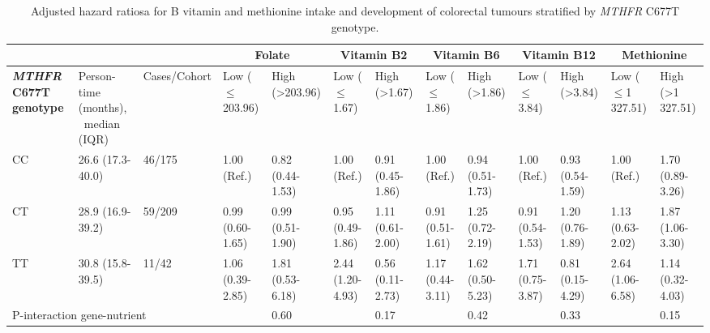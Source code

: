 \begin{sidewaystable}
\caption{Adjusted hazard ratiosa for B vitamin and methionine intake and development of colorectal tumours stratified by \emph{MTHFR} C677T genotype.}
\label{table6_3}
\begin{tabularx}{18cm}{XXXXXXXXXXXXX}
\hline ~ & ~ & ~ &
\multicolumn{2}{c}{\centering\bfseries Folate} &
\multicolumn{2}{c}{\centering\bfseries Vitamin B2} &
\multicolumn{2}{c}{\centering\bfseries Vitamin B6} &
\multicolumn{2}{c}{\centering\bfseries Vitamin B12} &
\multicolumn{2}{c}{\centering\bfseries Methionine}\\
\hline
 \textbf{\textit{MTHFR }}\textbf{C677T
genotype} & Person-time (months), \ median (IQR) & Cases/Cohort & Low (${\leq}$203.96) & High ({\textgreater}203.96) & Low (${\leq}$1.67) & High ({\textgreater}1.67) & Low (${\leq}$1.86) & High ({\textgreater}1.86) & Low (${\leq}$3.84) & High ({\textgreater}3.84) & Low (${\leq}$1 327.51) & High ({\textgreater}1 327.51)\\
\hline
 CC & 26.6 (17.3-40.0) & 46/175 & 1.00 (Ref.) & 0.82 (0.44-1.53) & 1.00 (Ref.) & 0.91 (0.45-1.86) & 1.00 (Ref.) & 0.94 (0.51-1.73) & 1.00 (Ref.) & 0.93 (0.54-1.59) & 1.00 (Ref.) & 1.70 (0.89-3.26)\\
\hline
 CT & 28.9 (16.9-39.2) & 59/209 & 0.99 (0.60-1.65) & 0.99 (0.51-1.90) & 0.95 (0.49-1.86) & 1.11 (0.61-2.00) & 0.91 (0.51-1.61) & 1.25 (0.72-2.19) & 0.91 (0.54-1.53) & 1.20 (0.76-1.89) & 1.13 (0.63-2.02) & 1.87 (1.06-3.30)\\
\hline
 TT & 30.8 (15.8-39.5) & 11/42 & 1.06 (0.39-2.85) & 1.81 (0.53-6.18) & 2.44 (1.20-4.93) & 0.56 (0.11-2.73) & 1.17 (0.44-3.11) & 1.62 (0.50-5.23) & 1.71 (0.75-3.87) & 0.81 (0.15-4.29) & 2.64 (1.06-6.58) & 1.14 (0.32-4.03)\\
\hline
 \multicolumn{4}{l}{P-interaction gene-nutrient} & 0.60 & ~ & 0.17 & ~ & 0.42 & ~ & 0.33 & ~ & 0.15\\
\hline
\end{tabularx}
\end{sidewaystable}










